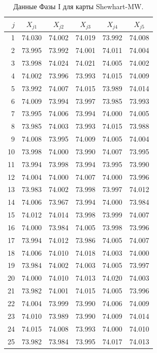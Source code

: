 \begin{table}[!ht]
	\centering
	\caption{Данные Фазы I для карты Shewhart-MW.}
	\label{tab:4.23}
	\small
	\begin{tabular}{@{}rccccc@{}}
		\toprule
		\(j\) & \(X_{j1}\) & \(X_{j2}\) & \(X_{j3}\) & \(X_{j4}\) & \(X_{j5}\) \\
		\midrule
		1 & 74.030 & 74.002 & 74.019 & 73.992 & 74.008 \\
		2 & 73.995 & 73.992 & 74.001 & 74.011 & 74.004 \\
		3 & 73.998 & 74.024 & 74.021 & 74.005 & 74.002 \\
		4 & 74.002 & 73.996 & 73.993 & 74.015 & 74.009 \\
		5 & 73.992 & 74.007 & 74.015 & 73.989 & 74.014 \\
		6 & 74.009 & 73.994 & 73.997 & 73.985 & 73.993 \\
		7 & 73.995 & 74.006 & 73.994 & 74.000 & 74.005 \\
		8 & 73.985 & 74.003 & 73.993 & 74.015 & 73.988 \\
		9 & 74.008 & 73.995 & 74.009 & 74.005 & 74.004 \\
		10 & 73.998 & 74.000 & 73.990 & 74.007 & 73.995 \\
		11 & 73.994 & 73.998 & 73.994 & 73.995 & 73.990 \\
		12 & 74.004 & 74.000 & 74.007 & 74.000 & 73.996 \\
		13 & 73.983 & 74.002 & 73.998 & 73.997 & 74.012 \\
		14 & 74.006 & 73.967 & 73.994 & 74.000 & 73.984 \\
		15 & 74.012 & 74.014 & 73.998 & 73.999 & 74.007 \\
		16 & 74.000 & 73.984 & 74.005 & 73.998 & 73.996 \\
		17 & 73.994 & 74.012 & 73.986 & 74.005 & 74.007 \\
		18 & 74.006 & 74.010 & 74.018 & 74.003 & 74.000 \\
		19 & 73.984 & 74.002 & 74.003 & 74.005 & 73.997 \\
		20 & 74.000 & 74.010 & 74.013 & 74.020 & 74.003 \\
		21 & 73.982 & 74.001 & 74.015 & 74.005 & 73.996 \\
		22 & 74.004 & 73.999 & 73.990 & 74.006 & 74.009 \\
		23 & 74.010 & 73.989 & 73.990 & 74.009 & 74.014 \\
		24 & 74.015 & 74.008 & 73.993 & 74.000 & 74.010 \\
		25 & 73.982 & 73.984 & 73.995 & 74.017 & 74.013 \\
		\bottomrule
	\end{tabular}
\end{table}

